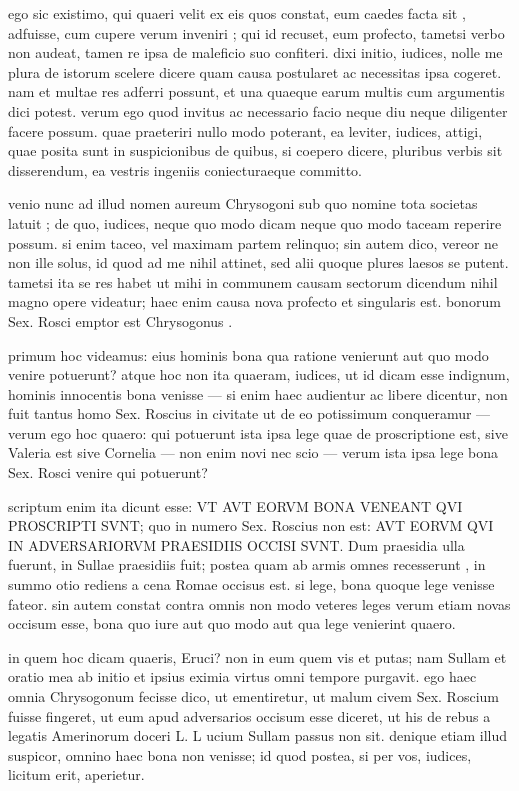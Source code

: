  ego sic existimo, qui quaeri velit ex eis quos constat, eum caedes facta sit , adfuisse, cum cupere verum inveniri ; qui id recuset, eum profecto, tametsi verbo non audeat, tamen re ipsa de maleficio suo confiteri. dixi initio, iudices, nolle me plura de istorum scelere dicere quam causa postularet ac necessitas ipsa cogeret. nam et multae res adferri possunt, et una quaeque earum multis cum argumentis dici potest. verum ego quod invitus ac necessario facio neque diu neque diligenter facere possum. quae praeteriri nullo modo poterant, ea leviter, iudices, attigi, quae posita sunt in suspicionibus de quibus, si coepero dicere, pluribus verbis sit disserendum, ea vestris ingeniis coniecturaeque committo.

 venio nunc ad illud nomen aureum Chrysogoni sub quo nomine tota societas latuit ; de quo, iudices, neque quo modo dicam neque quo modo taceam reperire possum. si enim taceo, vel maximam partem relinquo; sin autem dico, vereor ne non ille solus, id quod ad me nihil attinet, sed alii quoque plures laesos se putent. tametsi ita se res habet ut mihi in communem causam sectorum dicendum nihil magno opere videatur; haec enim causa nova profecto et singularis est. bonorum Sex. Rosci emptor est Chrysogonus .

 primum hoc videamus: eius hominis bona qua ratione venierunt aut quo modo venire potuerunt? atque hoc non ita quaeram, iudices, ut id dicam esse indignum, hominis innocentis bona venisse — si enim haec audientur ac libere dicentur, non fuit tantus homo Sex. Roscius in civitate ut de eo potissimum conqueramur — verum ego hoc quaero: qui potuerunt ista ipsa lege quae de proscriptione est, sive Valeria est sive Cornelia — non enim novi nec scio — verum ista ipsa lege bona Sex. Rosci venire qui potuerunt?

 scriptum enim ita dicunt esse: VT AVT EORVM BONA VENEANT QVI PROSCRIPTI SVNT; quo in numero Sex. Roscius non est: AVT EORVM QVI IN ADVERSARIORVM PRAESIDIIS OCCISI SVNT. Dum praesidia ulla fuerunt, in Sullae praesidiis fuit; postea quam ab armis omnes recesserunt , in summo otio rediens a cena Romae occisus est. si lege, bona quoque lege venisse fateor. sin autem constat contra omnis non modo veteres leges verum etiam novas occisum esse, bona quo iure aut quo modo aut qua lege venierint quaero.

 in quem hoc dicam quaeris, Eruci? non in eum quem vis et putas; nam Sullam et oratio mea ab initio et ipsius eximia virtus omni tempore purgavit. ego haec omnia Chrysogonum fecisse dico, ut ementiretur, ut malum civem Sex. Roscium fuisse fingeret, ut eum apud adversarios occisum esse diceret, ut his de rebus a legatis Amerinorum doceri L. L ucium Sullam passus non sit. denique etiam illud suspicor, omnino haec bona non venisse; id quod postea, si per vos, iudices, licitum erit, aperietur.

